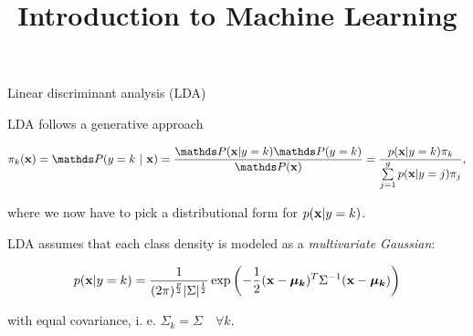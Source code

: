 \documentclass[11pt,compress,t,notes=noshow, xcolor=table]{beamer}
\title{Introduction to Machine Learning}
\begin{document}

\begin{vbframe}{Linear discriminant analysis (LDA)}


LDA follows a generative approach

$$\pikx = \postk = \frac{\P(\xv | y = k) \P(y = k)}{\P(\xv)} = \frac{\pdfxyk \pik}{\sumjg \pdfxyk[j] \pi_j},$$
  
where we now have to pick a distributional form for $p(\mathbf{x} | y= k)$.

\framebreak

LDA assumes that each class density is modeled as a \emph{multivariate Gaussian}:

$$
p(\mathbf{x} | y= k) = \frac{1}{(2\pi)^{\frac{p}{2}}|\Sigma|^{\frac{1}{2}}} \exp\left(-\frac{1}{2}(\mathbf{x} - \bm{\mu_k})^T \Sigma^{-1} (\mathbf{x} - \bm{\mu_k})\right)
$$

with equal covariance, i. e. $\Sigma_k = \Sigma \quad \forall k$. \\


\begin{knitrout}\scriptsize
{}\color{fgcolor}


\end{knitrout}
\end{vbframe}
\end{document}
